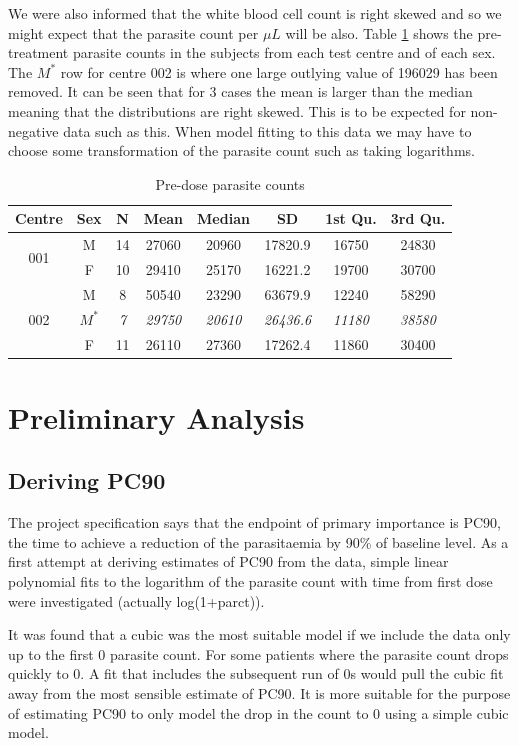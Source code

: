 We were also informed that the white blood cell count is right skewed and so we might expect that the parasite count per $\mu L$ will be also. Table \ref{predose} shows the pre-treatment parasite counts in the subjects from each test centre and of each sex. The $M^*$ row for centre 002 is where one large outlying value of 196029 has been removed. It can be seen that for 3 cases the mean is larger than the median meaning that the distributions are right skewed. This is to be expected for non-negative data such as this. When model fitting to this data we may have to choose some transformation of the parasite count such as taking logarithms.
\begin{table}[h]
\centering
\caption{Pre-dose parasite counts}\label{predose}
\begin{tabular}{|cc|cccccc|}
\hline
Centre&Sex&N&Mean&Median&SD&1st Qu.&3rd Qu.\\\hline
\multirow{2}{*}{001}&M&14&27060&20960&17820.9&16750&24830\\
&F&10&29410&25170&16221.2&19700&30700\\\hline
\multirow{3}{*}{002}&M&8&50540&23290&63679.9&12240&58290\\
&$M^*$&\textit{7}&\textit{29750}&\textit{20610}&\textit{26436.6}&\textit{11180}&\textit{38580}\\
&F&11&26110&27360&17262.4&11860&30400\\\hline
\end{tabular}
\end{table}
\pagebreak
\section{Preliminary Analysis}
\subsection{Deriving PC90}
The project specification says that the endpoint of primary importance is PC90, the time to achieve a reduction of the parasitaemia by 90\% of baseline level. As a first attempt at deriving estimates of PC90 from the data, simple linear polynomial fits to the logarithm of the parasite count with time from first dose were investigated (actually log(1+parct)).

It was found that a cubic was the most suitable model if we include the data only up to the first 0 parasite count. For some patients where the parasite count drops quickly to 0. A fit that includes the subsequent run of 0s would pull the cubic fit away from the most sensible estimate of PC90. It is more suitable for the purpose of estimating PC90 to only model the drop in the count to 0 using a simple cubic model. 


